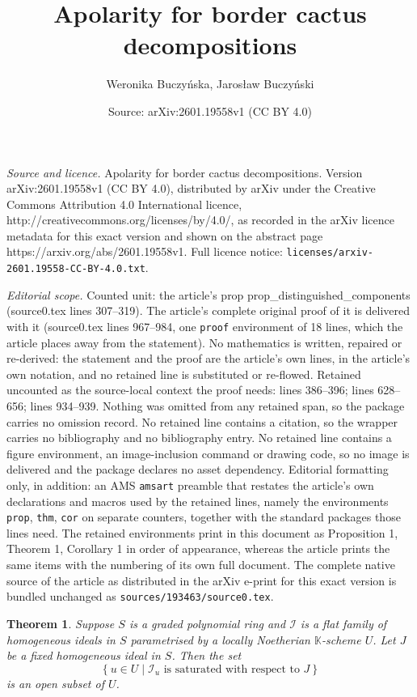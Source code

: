 \documentclass[10pt,a4paper]{amsart}
\title{Apolarity for border cactus decompositions}
\author{Weronika Buczy\'nska, Jaros{\l}aw Buczy\'nski}
\date{Source: arXiv:2601.19558v1 (CC BY 4.0)}
\newtheorem{thm}{Theorem}
\def\KK{{\mathbb K}}
\newcommand{\ccI}{{\mathcal{I}}}
\begin{document}
\maketitle

\noindent\emph{Source and licence.} Apolarity for border cactus decompositions. Version arXiv:2601.19558v1 (CC BY 4.0), distributed by arXiv under the Creative Commons Attribution 4.0 International licence, http://creativecommons.org/licenses/by/4.0/, as recorded in the arXiv licence metadata for this exact version and shown on the abstract page https://arxiv.org/abs/2601.19558v1. Full licence notice: \texttt{licenses/arxiv-2601.19558-CC-BY-4.0.txt}.\par\smallskip

\noindent\textit{Editorial scope.} Counted unit: the article's prop prop\_distinguished\_components (source0.tex lines 307--319). The article's complete original proof of it is delivered with it (source0.tex lines 967--984, one \texttt{proof} environment of 18 lines, which the article places away from the statement). No mathematics is written, repaired or re-derived: the statement and the proof are the article's own lines, in the article's own notation, and no retained line is substituted or re-flowed.  Retained uncounted as the source-local context the proof needs: lines 386--396; lines 628--656; lines 934--939.  Nothing was omitted from any retained span, so the package carries no omission record.  No retained line contains a citation, so the wrapper carries no bibliography and no bibliography entry.  No retained line contains a figure environment, an image-inclusion command or drawing code, so no image is delivered and the package declares no asset dependency.  Editorial formatting only, in addition: an AMS \texttt{amsart} preamble that restates the article's own declarations and macros used by the retained lines, namely the environments \texttt{prop}, \texttt{thm}, \texttt{cor} on separate counters, together with the standard packages those lines need.  The retained environments print in this document as Proposition 1, Theorem 1, Corollary 1 in order of appearance, whereas the article prints the same items with the numbering of its own full document.  The complete native source of the article as distributed in the arXiv e-print for this exact version is bundled unchanged as \texttt{sources/193463/source0.tex}.
\begin{thm}\label{thm_saturation_is_open_property}
   Suppose $S$ is a graded polynomial ring and
      $\ccI$ is a flat family of homogeneous ideals in $S$
      parametrised by a locally Noetherian $\KK$-scheme $U$.
   Let $J$ be a fixed homogeneous ideal in $S$.
   Then the set
        \[
            \left\{ u\in U \mid  \ccI_u \text{ is saturated with respect to $J$} \right\}
        \]
        is an open subset of $U$.
\end{thm}
\end{document}
